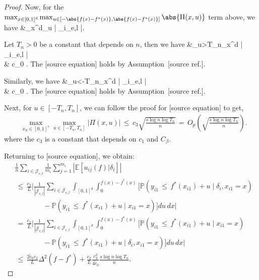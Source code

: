 \documentclass[twoside,11pt]{article}
\makeatletter
\newcommand{\discardlabel}[1]{}
\newcommand{\discardtwo}[2]{}
\newcommand{\legacyref}[1]{\textup{[source ref.]}}
\newcommand{\legacyeqref}[1]{\textup{[source equation]}}
\newenvironment{legacycomparison}{%
  \begingroup\color{legacygray}%
  \let\label\discardlabel
  \let\originallabel\discardlabel
  \let\ref\legacyref
  \let\pageref\legacyref
  \let\eqref\legacyeqref
  \let\cref\legacyref
  \let\Cref\legacyref
  \let\autoref\legacyref
  \let\aliasref\discardtwo
}{\endgroup}
\newcommand{\aliasref}[2]{%
  \@ifundefined{r@#2}{}{%
    \expandafter\let\csname r@#1\expandafter\endcsname\csname r@#2\endcsname}}
\makeatother
\begin{document}
\begin{legacycomparison}
\begin{proof}
Now, for the $\max_{x\in[0,1]^d}\max_{u \in [-\abs{f(x) - f^*(x)}, \abs{f(x) - f^*(x)}]} \abs{\Pi(x,u)}$ term above, we have
\bea
&\max_{x\in [0,1]^d}\max_{u} \bigg|  \sum_{i\in {}_{e,l}} \bigg[ \mathbb{P}(y_{i1} \,\leq\, f^*(x_{i1}) + u\mid x_{i1} = x) \\
&\quad - \mathbb{P}(y_{i1} \,\leq\, f^*(x_{i1}) + u \mid \delta_i, x_{i1} = x) \bigg] \bigg|.
\bea

Let $T_n > 0$ be a constant that depends on $n$, then we have 
\bea 
&\max_{u>T_n}\max_{x\in [0,1]^d} \left|  \sum_{i\in {}_{e,l}} \left[\mathbb{P}(\delta_{i}(x_{i1}) + e_{i1} \,\leq\, u \mid \delta_i, x_{i1} = x) - \mathbb{P}( \delta_{i}(x_{i1}) + e_{i1} \,\leq\, u\mid x_{i1} = x)\right] \right| \\
& \tilde c_0 .
\bea 
The \eqref{leq920} holds by Assumption~\ref{ass:tail_multi_d}.


Similarly, we have 
\bea 
&\max_{u<-T_n}\max_{x\in [0,1]^d} \left|  \sum_{i\in {}_{e,l}} \left[\mathbb{P}(\delta_{i}(x_{i1}) + e_{i1} \,\leq\, u \mid \delta_i, x_{i1} = x) - \mathbb{P}( \delta_{i}(x_{i1}) + e_{i1} \,\leq\, u\mid x_{i1} = x)\right] \right| \\
& \tilde c_0 .
\bea 
The \eqref{leq925} holds by Assumption~\ref{ass:tail_multi_d}.



Next, for $u \in [-T_n, T_n]$, we can follow the proof for \eqref{in1116} to get, 
\begin{align*}
    &\max_{x_S \in [0,1]^s} \max_{u \in [-T_n, T_n]} |\Pi(x,u)| \,\leq\, c_3\sqrt{\frac{s\log n \log T_n}{n}} \,=\, O_p \left(\sqrt{\frac{s\log n\log T_n}{n}}\right).
\end{align*}
where the $c_3$ is a constant that depends on $c_1$ and $C_{\beta}$. 


Returning to \eqref{eq_c_482}, we obtain:
\begin{align*}
    &\frac{1}{n}\sum_{i \in \mathcal{J}_{e,l}} \frac{1}{m_i}\sum_{j=1}^{m_{i}}\left|\mathbb{E}[u_{ij}(f)|\delta_i]\right| \\
    &\,\leq\, \frac{c_2}{L}\bigg| \frac{1}{|\mathcal{J}_{e,l}|} \sum_{i\in \mathcal{J}_{e,l}} \int_{[0,1]^d}\int_0^{f(x) - f^*(x)} \Big[ \mathbb{P}(y_{i1} \,\leq\, f^*(x_{i1}) + u \mid \delta_i, x_{i1}=x) \\
    &\qquad\qquad - \mathbb{P}(y_{i1} \,\leq\, f^*(x_{i1}) + u \mid x_{i1} = x) \Big] du \, dx \bigg| \\
    &\,=\, \frac{c_2}{L}\bigg| \frac{1}{|\mathcal{J}_{e,l}|} \sum_{i\in \mathcal{J}_{e,l}} \int_{[0,1]^d}\int_0^{f(x) - f^*(x)} \Big[ \mathbb{P}(y_{i1} \,\leq\, f^*(x_{i1}) + u \mid x_{i1}=x) \\
    &\qquad\qquad - \mathbb{P}(y_{i1} \,\leq\, f^*(x_{i1}) + u \mid \delta_i, x_{i1} = x) \Big] du \, dx \bigg| \\
&\,\leq\, \frac{2\tilde c_0c_2}{L}  \Delta^2(f-f^*)+ \frac{c_2}{L}\frac{c_3^2}{4\tilde c_0}\frac{s\log n\log T_n}{n}.
\end{align*}


\end{proof}
\end{legacycomparison}
\end{document}
